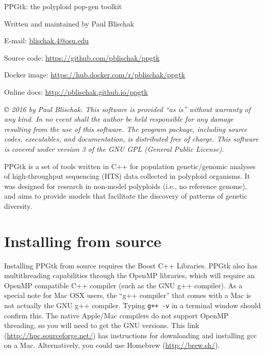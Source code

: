 \documentclass[11pt,english,letterpaper,oneside]{article}
\begin{document}
\pagestyle{empty}

\vspace*{1.5in}
\begin{center}

	{\huge PPGtk: the polyploid pop-gen toolkit}
	\vspace{0.5in}

	Written and maintained by Paul Blischak

	E-mail: {\href{mailto:blischak.4@osu.edu}{blischak.4@osu.edu}}

	Source code: {\url{https://github.com/pblischak/ppgtk}}
	
	Docker image: {\url{https://hub.docker.com/r/pblischak/ppgtk}}

	Online docs: {\url{http://pblischak.github.io/ppgtk}}

\end{center}

\vspace{4in}

{\small \textit{\copyright{} 2016 by Paul Blischak. This software is provided ``as is'' without warranty of any kind. In no event shall the author be held responsible for any damage resulting from the use of this software. The program package, including source codes, executables, and documentation, is distributed free of charge. This software is covered under version 3 of the GNU GPL (General Public License).}}

\newpage

{ \tableofcontents }

\newpage

\clearpage
\pagestyle{plain}
\setcounter{page}{1}

PPGtk is a set of tools written in C++ for population genetic/genomic analyses of high-throughput sequencing (HTS) data collected in polyploid organisms. It was designed for research in non-model polyploids (i.e., no reference genome), and aims to provide models that facilitate the discovery of patterns of genetic diversity. 



\section{Installing from source}

Installing PPGtk from source requires the Boost C++ Libraries. PPGtk also has multithreading capabilities through the OpenMP libraries, which will require an OpenMP compatible C++ compiler (such as the GNU g++ compiler). As a special note for Mac OSX users, the ``g++ compiler'' that comes with a Mac is not actually the GNU g++ compiler. Typing \texttt{g++ -v} in a terminal window should confirm this. The native Apple/Mac compilers do not support OpenMP threading, so you will need to get the GNU versions. This link ({\url{http://hpc.sourceforge.net/}}) has instructions for downloading and installing gcc on a Mac. Alternatively, you could use Homebrew ({\url{http://brew.sh/}}).
\end{document}
